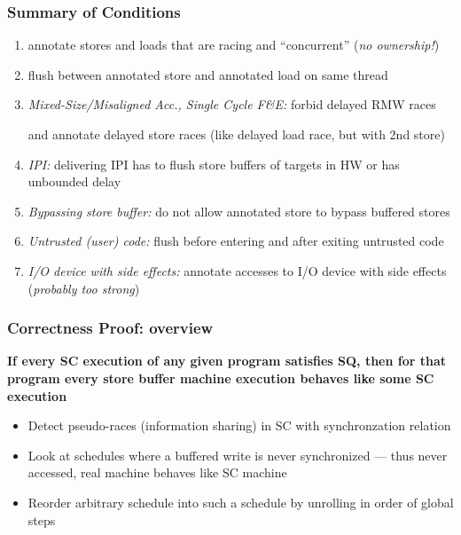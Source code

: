 \documentclass{beamer}
\begin{document}
\begin{frame}[allowframebreaks]
\frametitle{Summary of Conditions}
\begin{enumerate} 
\item annotate stores and loads that are racing and ``concurrent'' ({\em no ownership!})
\item flush between annotated store and annotated load on same thread
\item {\em Mixed-Size/Misaligned Acc., Single Cycle F\&E:} forbid delayed RMW races
\begin{center}
\end{center}
and annotate delayed store races (like delayed load race, but with 2nd store)
\item {\em IPI:} delivering IPI has to flush store buffers of targets in HW or has unbounded delay
\item {\em Bypassing store buffer:} do not allow annotated store to bypass buffered stores
\item {\em Untrusted (user) code:} flush before entering and after exiting untrusted code
\item {\em I/O device with side effects:} annotate accesses to I/O device with side effects ({\em probably too strong})
\end{enumerate}
\end{frame}

\begin{frame} 
\frametitle{Correctness Proof: overview}

\textbf{If every SC execution of any given program satisfies SQ, then for that program every store buffer machine execution behaves like some SC execution}\\[20pt]


\begin{itemize} 
\item Detect pseudo-races (information sharing) in SC with synchronzation relation
\begin{center}
\end{center}

\item Look at schedules where a buffered write is never synchronized --- thus never accessed, real machine behaves like SC machine

\item Reorder arbitrary schedule into such a schedule by unrolling in order of global steps 

\end{itemize} 
\end{frame} 
\end{document}
